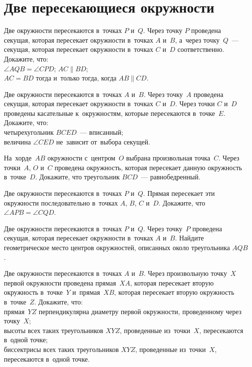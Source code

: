 
\section*{Две пересекающиеся окружности}


\begin{problems}

\item
Две окружности пересекаются в~точках $P$ и~$Q$.
Через точку $P$ проведена секущая, которая пересекает окружности
в~точках $A$ и~$B$, а~через точку~$Q$~--- секущая, которая пересекает
окружности в~точках $C$ и~$D$ соответственно.
Докажите, что:
\\
\subproblem $\angle AQB = \angle CPD$;
\quad
\subproblem $AC \parallel BD$;
\\
\subproblem $AC = BD$ тогда и~только тогда, когда $AB \parallel CD$.

\item
Две окружности пересекаются в~точках $A$ и~$B$.
Через точку~$A$ проведена секущая, которая пересекает окружности
в~точках $C$ и~$D$.
Через точки $C$ и~$D$ проведены касательные к~окружностям, которые пересекаются
в~точке~$E$.
Докажите, что:
\\
\subproblem четырехугольник $BCED$~--- вписанный;
\\
\subproblem величина $\angle CED$ не~зависит от~выбора секущей.

\item
На~хорде~$AB$ окружности с~центром~$O$ выбрана произвольная точка~$C$.
Через точки~$A$, $O$ и~$C$ проведена окружность, которая пересекает данную
окружность в~точке~$D$.
Докажите, что треугольник $BCD$~--- равнобедренный.

\item
Две окружности пересекаются в~точках $P$ и~$Q$.
Прямая пересекает эти окружности последовательно в~точках $A$, $B$, $C$ и~$D$.
Докажите, что $\angle APB = \angle CQD$.

\item
Две окружности пересекаются в~точках $P$ и~$Q$.
Через точку~$P$ проведена секущая, которая пересекает окружности
в~точках $A$ и~$B$.
Найдите геометрическое место центров окружностей, описанных около
треугольника $AQB$.

\item
Две окружности пересекаются в~точках $A$ и~$B$.
Через произвольную точку~$X$ первой окружности проведена прямая~$XA$, которая
пересекает вторую окружность в~точке~$Y$ и~прямая~$XB$, которая пересекает
вторую окружность в~точке~$Z$.
Докажите, что:
\\
\subproblem
прямая~$YZ$ перпендикулярна диаметру первой окружности, проведенному через
точку~$X$;
\\
\subproblem
высоты всех таких треугольников $XYZ$, проведенные из~точки~$X$, пересекаются
в~одной точке;
\\
\subproblem
биссектрисы всех таких треугольников $XYZ$, проведенные из~точки~$X$,
пересекаются в~одной точке.


\end{problems}
